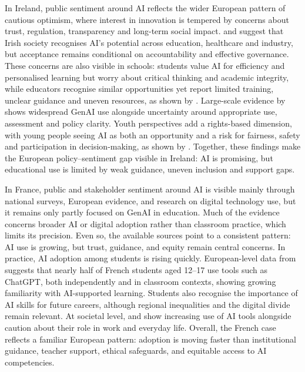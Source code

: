 In Ireland, public sentiment around AI reflects the wider European pattern of
cautious optimism, where interest in innovation is tempered by concerns about trust,
regulation, transparency and long-term social impact. \cite{irfan2023irelandai} and
\cite{ucd2023aiperceptions} suggest that Irish society recognises AI's potential
across education, healthcare and industry, but acceptance remains conditional on
accountability and effective governance. These concerns are also visible in schools:
students value AI for efficiency and personalised learning but worry about critical
thinking and academic integrity, while educators recognise similar opportunities yet
report limited training, unclear guidance and uneven resources, as shown by
\cite{ai4t2023ireland}. Large-scale evidence by \cite{qqi2025genai} shows widespread
GenAI use alongside uncertainty around appropriate use, assessment and policy
clarity. Youth perspectives add a rights-based dimension, with young people seeing AI
as both an opportunity and a risk for fairness, safety and participation in
decision-making, as shown by \cite{oco2024aiyoungpeople}. Together, these findings
make the European policy--sentiment gap visible in Ireland: AI is promising, but
educational use is limited by weak guidance, uneven inclusion and support gaps.

In France, public and stakeholder sentiment around AI is visible mainly through
national surveys, European evidence, and research on digital technology use, but it
remains only partly focused on GenAI in education. Much of the evidence concerns
broader AI or digital adoption rather than classroom practice, which limits its
precision. Even so, the available sources point to a consistent pattern: AI use is
growing, but trust, guidance, and equity remain central concerns. In practice, AI
adoption among students is rising quickly. European-level data from
\cite{vodafone2025aieuschools} suggests that nearly half of French students aged
12--17 use tools such as ChatGPT, both independently and in classroom contexts,
showing growing familiarity with AI-supported learning. Students also recognise the
importance of AI skills for future careers, although regional inequalities and the
digital divide remain relevant. At societal level,
\cite{anctcredoc2025frenchaisentiment} and \cite{brice2025frenchdigitalsociety} show
increasing use of AI tools alongside caution about their role in work and everyday
life. Overall, the French case reflects a familiar European pattern: adoption is
moving faster than institutional guidance, teacher support, ethical safeguards, and
equitable access to AI competencies.


